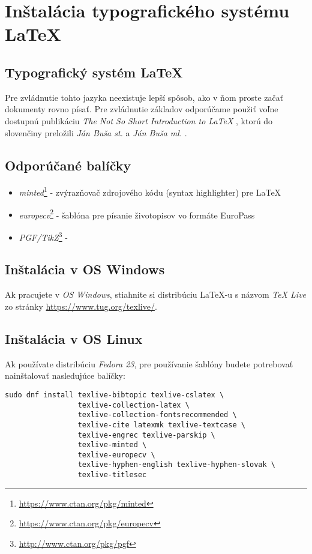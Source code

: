 \chapter{Inštalácia typografického systému \LaTeX}
\label{ch:instalacia}

\section{Typografický systém \LaTeX}

Pre zvládnutie tohto jazyka neexistuje lepší spôsob, ako v ňom proste začať dokumenty rovno písať. Pre zvládnutie základov odporúčame použiť voľne dostupnú publikáciu \emph{The Not So Short Introduction to \LaTeX} \cite{lshort}, ktorú do slovenčiny preložili \emph{Ján Buša st.} a \emph{Ján Buša ml.} \cite{lshortsk}.

\section{Odporúčané balíčky}
\begin{itemize}
    \item \emph{minted}\footnote{\url{https://www.ctan.org/pkg/minted}} - zvýrazňovač zdrojového kódu (syntax highlighter) pre \LaTeX 
    \item \emph{europecv}\footnote{\url{https://www.ctan.org/pkg/europecv}} - šablóna pre písanie životopisov vo formáte EuroPass 
    \item \emph{PGF/TikZ}\footnote{\url{http://www.ctan.org/pkg/pgf}} -  
\end{itemize}

\section{Inštalácia v OS Windows}

Ak pracujete v \emph{OS Windows}, stiahnite si distribúciu \LaTeX-u s názvom \emph{TeX Live} zo stránky \url{https://www.tug.org/texlive/}.

\section{Inštalácia v OS Linux}

Ak používate distribúciu \emph{Fedora 23}, pre používanie šablóny budete potrebovať nainštalovať nasledujúce balíčky:

\begin{verbatim}
sudo dnf install texlive-bibtopic texlive-cslatex \
                 texlive-collection-latex \
                 texlive-collection-fontsrecommended \
                 texlive-cite latexmk texlive-textcase \
                 texlive-engrec texlive-parskip \
                 texlive-minted \
                 texlive-europecv \
                 texlive-hyphen-english texlive-hyphen-slovak \
                 texlive-titlesec
\end{verbatim}


